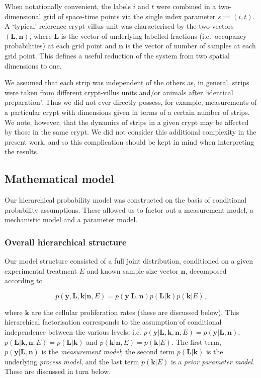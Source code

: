 \documentclass[10pt,letterpaper]{article}
\begin{document}
When notationally convenient, the labels \(i\) and \(t\) were combined
in a two-dimensional grid of space-time points via the single index
parameter \(s := (i,t)\). A `typical' reference crypt-villus unit was
characterised by the two vectors \((\mathbf{L},\mathbf{n})\), where
\(\mathbf{L}\) is the vector of underlying labelled fractions
(i.e.~occupancy probabilities) at each grid point and \(\mathbf{n}\) is
the vector of number of samples at each grid point. This defines a
useful reduction of the system from two spatial dimensions to one.

We assumed that each strip was independent of the others as, in general,
strips were taken from different crypt-villus units and/or animals after
`identical preparation'. Thus we did not ever directly possess, for
example, measurements of a particular crypt with dimensions given in
terms of a certain number of strips. We note, however, that the dynamics
of strips in a given crypt may be affected by those in the same crypt.
We did not consider this additional complexity in the present work, and
so this complication should be kept in mind when interpreting the
results.

\subsection{Mathematical model}\label{materials-and-methods-ii-mathematical-model}

Our hierarchical probability model was constructed on the basis of
conditional probability assumptions. These allowed us to factor out a
measurement model, a mechanistic model and a parameter model.

\subsubsection{Overall hierarchical
structure}\label{overall-hierarchical-structure}

Our model structure consisted of a full joint distribution, conditioned
on a given experimental treatment \(E\) and known sample size vector
\(\mathbf{n}\), decomposed according to

\begin{equation}p(\mathbf{y},\mathbf{L},\mathbf{k}|\mathbf{n},E) = p(\mathbf{y}|\mathbf{L},\mathbf{n})p(\mathbf{L}|\mathbf{k})p(\mathbf{k}|E),\label{eq:decomp}\end{equation}

where \(\mathbf{k}\) are the cellular proliferation rates (these are
discussed below). This hierarchical factorisation corresponds to the
assumption of conditional independence between the various levels, i.e.
\(p(\mathbf{y}|\mathbf{L},\mathbf{k},\mathbf{n},E) = p(\mathbf{y}|\mathbf{L},\mathbf{n})\),
\(p(\mathbf{L}|\mathbf{k},\mathbf{n},E) = p(\mathbf{L}|\mathbf{k})\) and
\(p(\mathbf{k}|\mathbf{n},E) = p(\mathbf{k}|E)\). The first term,
\(p(\mathbf{y}|\mathbf{L},\mathbf{n})\) is the \emph{measurement model};
the second term \(p(\mathbf{L}|\mathbf{k})\) is the underlying
\emph{process model}, and the last term \(p(\mathbf{k}|E)\) is a
\emph{prior parameter model}. These are discussed in turn below.
\end{document}

